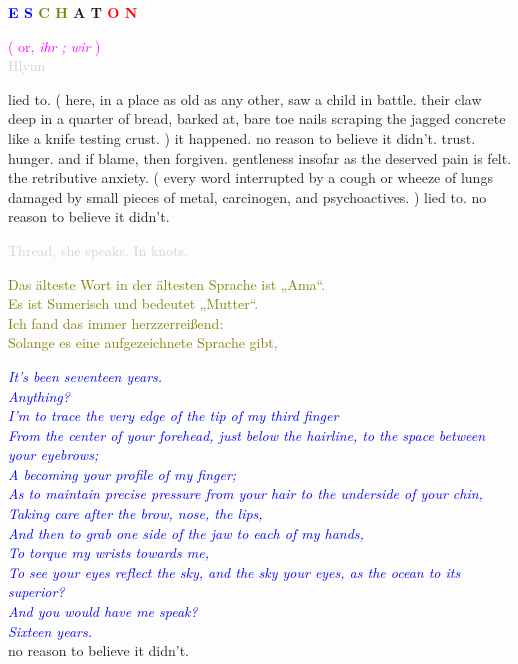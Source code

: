 \documentclass[11pt]{article}
\begin{document}
\begingroup
\begin{center}
\huge \textbf{\textcolor{blue}{E S} \textcolor{olive}{C H} A T \textcolor{red}{O N}}
\end{center}
\endgroup

\begingroup
\begin{center}
\textcolor{magenta}{( or, \textit{ihr ; wir} )} \\ \textcolor{lightgray}{Hlynn}
\end{center}
\endgroup

\vspace*{2\baselineskip}

\begingroup
lied to. ( here, in a place as old as any other, saw a child in battle. their claw deep in a quarter of bread, barked at, bare toe nails scraping the jagged concrete like a knife testing crust. ) it happened. no reason to believe it didn't. trust. hunger. and if blame, then forgiven. gentleness insofar as the deserved pain is felt. the retributive anxiety. ( every word interrupted by a cough or wheeze of lungs damaged by small pieces of metal, carcinogen, and psychoactives. ) lied to. no reason to believe it didn't.
\endgroup

\begingroup
\begin{center}
\textcolor{lightgray}{Thread, she speaks. In knots.}
\rightskip\leftskip
\end{center}
\endgroup

\begingroup
\begin{center}
\textcolor{olive}{Das älteste Wort in der ältesten Sprache ist „Ama“. \\ Es ist Sumerisch und bedeutet „Mutter“. \\ Ich fand das immer herzzerreißend: \\ Solange es eine aufgezeichnete Sprache gibt,}
\end{center}
\endgroup

\begingroup
\begin{center}
\textit{\textcolor{blue}{It's been seventeen years. \\ Anything? \\ I'm to trace the very edge of the tip of my third finger \\ From the center of your forehead, just below the hairline, to the space between your eyebrows; \\ A becoming your profile of my finger; \\ As to maintain precise pressure from your hair to the underside of your chin, \\ Taking care after the brow, nose, the lips, \\ And then to grab one side of the jaw to each of my hands, \\ To torque my wrists towards me, \\ To see your eyes reflect the sky, and the sky your eyes, as the ocean to its superior? \\ And you would have me speak? \\ Sixteen years. } } \\ no reason to believe it didn't. 
\end{center}
\endgroup
\end{document}
